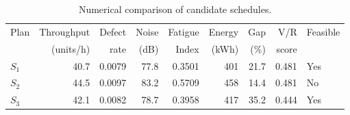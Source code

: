 \begin{table}[htbp]
\centering
\caption{Numerical comparison of candidate schedules.}
\label{tab:numerical-sim}
\small
\begin{tabular}{@{}lrrrrrrrl@{}}
\toprule
Plan & Throughput & Defect & Noise & Fatigue & Energy & Gap & V/R & Feasible \\
     & (units/h)  & rate   & (dB)  & Index   & (kWh)  & (\%) & score &         \\
\midrule
$S_{1}$ & 40.7 & 0.0079 & 77.8 & 0.3501 & 401 & 21.7 & 0.481 & Yes \\
$S_{2}$ & 44.5 & 0.0097 & 83.2 & 0.5709 & 458 & 14.4 & 0.481 & No \\
$S_{3}$ & 42.1 & 0.0082 & 78.7 & 0.3958 & 417 & 35.2 & 0.444 & Yes \\
\bottomrule
\end{tabular}
\end{table}
